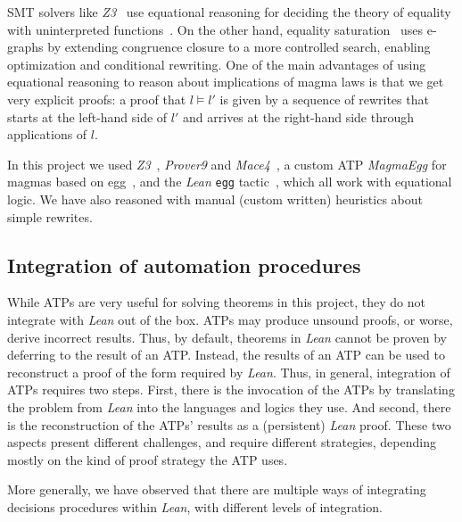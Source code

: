 SMT solvers like \emph{Z3}~\cite{DBLP:conf/tacas/MouraB08} use equational reasoning for deciding the theory of equality with uninterpreted functions~\cite{DBLP:series/txtcs/KroeningS16,DBLP:conf/cade/MouraB07}.
On the other hand, equality saturation~\cite{DBLP:journals/pacmpl/WillseyNWFTP21} uses e-graphs by extending congruence closure to a more controlled search, enabling optimization and conditional rewriting.
One of the main advantages of using equational reasoning to reason about implications of magma laws is that we get very explicit proofs: a proof that $l \models l'$ is given by a sequence of rewrites that starts at the left-hand side of $l'$ and arrives at the right-hand side through applications of $l$.

In this project we used \emph{Z3}~\cite{DBLP:conf/tacas/MouraB08}, \emph{Prover9} and \emph{Mace4}~\cite{prover9-mace4}, a custom ATP \emph{MagmaEgg} for magmas based on egg~\cite{DBLP:journals/pacmpl/WillseyNWFTP21}, and the \emph{Lean} \texttt{egg} tactic~\cite{DBLP:journals/pacmpl/KoehlerGBGTS24,rossel2024equality}, which all work with equational logic. We have also reasoned with manual (custom written) heuristics about simple rewrites.

\subsection{Integration of automation procedures}
\label{sec:proof-reconstruction}

While ATPs are very useful for solving theorems in this project, they do not integrate with \emph{Lean} out of the box.
ATPs may produce unsound proofs, or worse, derive incorrect results.
Thus, by default, theorems in \emph{Lean} cannot be proven by deferring to the result of an ATP.
Instead, the results of an ATP can be used to reconstruct a proof of the form required by \emph{Lean}.
Thus, in general, integration of ATPs requires two steps.
First, there is the invocation of the ATPs by translating the problem from \emph{Lean} into the languages and logics they use.
And second, there is the reconstruction of the ATPs' results as a (persistent) \emph{Lean} proof.
These two aspects present different challenges, and require different strategies, depending mostly on the kind of proof strategy the ATP uses.

More generally, we have observed that there are multiple ways of integrating decisions procedures within \emph{Lean}, with different levels of integration.

